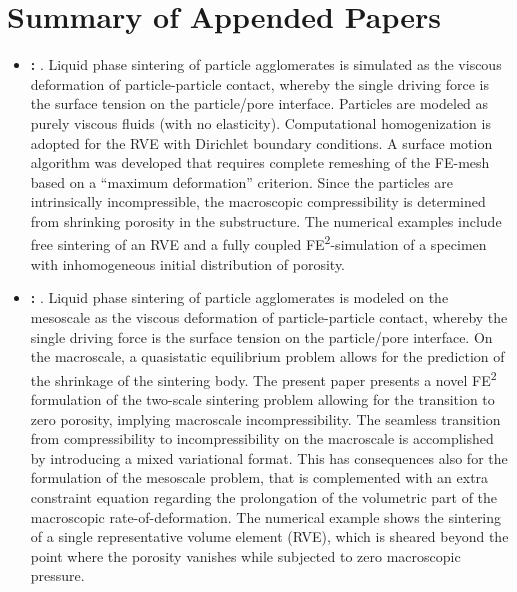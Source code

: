 \documentclass[ExampleMasters.tex]{subfiles}
\begin{document}
\chapter{Summary of Appended Papers}
\begin{itemize}
 \item \textbf{: }.
Liquid phase sintering of particle agglomerates is simulated as the viscous deformation of particle-particle contact, whereby the single driving force is the surface tension on the particle/pore interface.
Particles are modeled as purely viscous fluids (with no elasticity). 
Computational homogenization is adopted for the RVE with Dirichlet boundary conditions.
A surface motion algorithm was developed that requires complete remeshing of the FE-mesh based on a ``maximum deformation'' criterion. 
Since the particles are intrinsically incompressible, the macroscopic compressibility is determined from shrinking porosity in the substructure.
The numerical examples include free sintering of an RVE and a fully coupled FE\textsuperscript{2}-simulation of a specimen with inhomogeneous initial distribution of porosity.

 \item \textbf{: }.
Liquid phase sintering of particle agglomerates is modeled on the mesoscale as the viscous deformation of particle-particle contact, whereby the single driving force is the surface tension on the particle/pore interface.
On the macroscale, a quasistatic equilibrium problem allows for the prediction of the shrinkage of the sintering body. 
The present paper presents a novel FE\textsuperscript{2} formulation of the two-scale sintering problem allowing for the transition to zero porosity, implying macroscale incompressibility.
The seamless transition from compressibility to incompressibility on the macroscale is accomplished by introducing a mixed variational format.
This has consequences also for the formulation of the mesoscale problem, that is complemented with an extra constraint equation regarding the prolongation of the volumetric part of the macroscopic rate-of-deformation.
The numerical example shows the sintering of a single representative volume element (RVE), which is sheared beyond the point where the porosity vanishes while subjected to zero macroscopic pressure.


\end{itemize}
\end{document}
